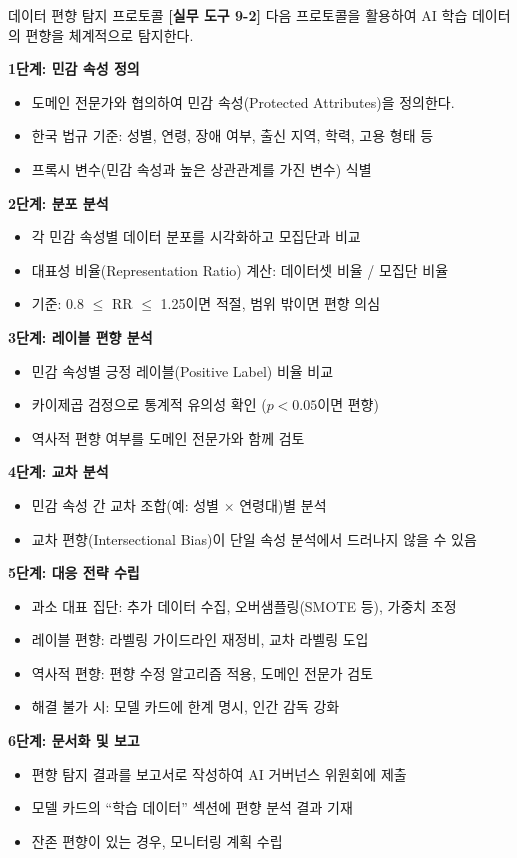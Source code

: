 \begin{practicaltool}{데이터 편향 탐지 프로토콜}
\textbf{[실무 도구 9-2]} 다음 프로토콜을 활용하여 AI 학습 데이터의 편향을 체계적으로 탐지한다.

\textbf{1단계: 민감 속성 정의}
\begin{itemize}
 \item 도메인 전문가와 협의하여 민감 속성(Protected Attributes)을 정의한다.
 \item 한국 법규 기준: 성별, 연령, 장애 여부, 출신 지역, 학력, 고용 형태 등
 \item 프록시 변수(민감 속성과 높은 상관관계를 가진 변수) 식별
\end{itemize}

\textbf{2단계: 분포 분석}
\begin{itemize}
 \item 각 민감 속성별 데이터 분포를 시각화하고 모집단과 비교
 \item 대표성 비율(Representation Ratio) 계산: 데이터셋 비율 / 모집단 비율
 \item 기준: 0.8 $\leq$ RR $\leq$ 1.25이면 적절, 범위 밖이면 편향 의심
\end{itemize}

\textbf{3단계: 레이블 편향 분석}
\begin{itemize}
 \item 민감 속성별 긍정 레이블(Positive Label) 비율 비교
 \item 카이제곱 검정으로 통계적 유의성 확인 ($p < 0.05$이면 편향)
 \item 역사적 편향 여부를 도메인 전문가와 함께 검토
\end{itemize}

\textbf{4단계: 교차 분석}
\begin{itemize}
 \item 민감 속성 간 교차 조합(예: 성별 $\times$ 연령대)별 분석
 \item 교차 편향(Intersectional Bias)이 단일 속성 분석에서 드러나지 않을 수 있음
\end{itemize}

\textbf{5단계: 대응 전략 수립}
\begin{itemize}
 \item 과소 대표 집단: 추가 데이터 수집, 오버샘플링(SMOTE 등), 가중치 조정
 \item 레이블 편향: 라벨링 가이드라인 재정비, 교차 라벨링 도입
 \item 역사적 편향: 편향 수정 알고리즘 적용, 도메인 전문가 검토
 \item 해결 불가 시: 모델 카드에 한계 명시, 인간 감독 강화
\end{itemize}

\textbf{6단계: 문서화 및 보고}
\begin{itemize}
 \item 편향 탐지 결과를 보고서로 작성하여 AI 거버넌스 위원회에 제출
 \item 모델 카드의 ``학습 데이터'' 섹션에 편향 분석 결과 기재
 \item 잔존 편향이 있는 경우, 모니터링 계획 수립
\end{itemize}
\end{practicaltool}


